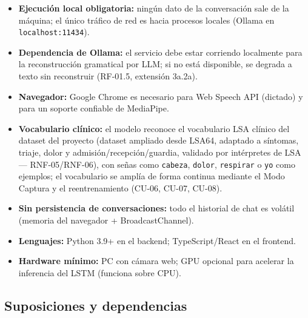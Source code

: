 \begin{itemize}
    \item \textbf{Ejecución local obligatoria:} ningún dato de la conversación sale de la máquina; el único tráfico de red es hacia procesos locales (Ollama en \texttt{localhost:11434}).
    \item \textbf{Dependencia de Ollama:} el servicio debe estar corriendo localmente para la reconstrucción gramatical por LLM; si no está disponible, se degrada a texto sin reconstruir (RF-01.5, extensión 3a.2a).
    \item \textbf{Navegador:} Google Chrome es necesario para Web Speech API (dictado) y para un soporte confiable de MediaPipe.
    \item \textbf{Vocabulario clínico:} el modelo reconoce el vocabulario LSA clínico del dataset del proyecto (dataset ampliado desde LSA64, adaptado a síntomas, triaje, dolor y admisión/recepción/guardia, validado por intérpretes de LSA --- RNF-05/RNF-06), con señas como \texttt{cabeza}, \texttt{dolor}, \texttt{respirar} o \texttt{yo} como ejemplos; el vocabulario se amplía de forma continua mediante el Modo Captura y el reentrenamiento (CU-06, CU-07, CU-08).
    \item \textbf{Sin persistencia de conversaciones:} todo el historial de chat es volátil (memoria del navegador + BroadcastChannel).
    \item \textbf{Lenguajes:} Python 3.9+ en el backend; TypeScript/React en el frontend.
    \item \textbf{Hardware mínimo:} PC con cámara web; GPU opcional para acelerar la inferencia del LSTM (funciona sobre CPU).
\end{itemize}

\subsection{Suposiciones y dependencias}

